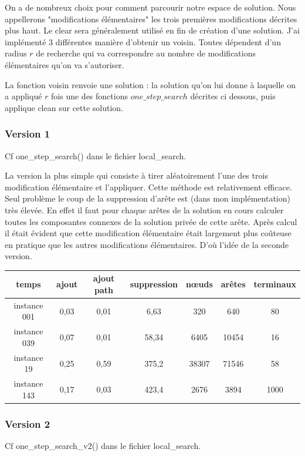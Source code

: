 \documentclass[10pt,a4paper]{article}
\begin{document}
On a de nombreux choix pour comment parcourir notre espace de solution. Nous appellerons "modifications élémentaires" les trois premières modifications décrites plus haut. Le clear sera généralement utilisé en fin de création d'une solution. J'ai implémenté 3 différentes manière d'obtenir un voisin. Toutes dépendent d'un radius $ r$ de recherche qui va correspondre au nombre de modifications élémentaires qu'on va s'autoriser. 

La fonction voisin renvoie une solution : la solution qu'on lui donne à laquelle on a appliqué $r$ fois une des fonctions $one\_step\_search$ décrites ci dessous, puis applique clean sur cette solution.

\subsubsection{Version 1}

Cf one\_step\_search() dans le fichier local\_search.

La version la plus simple qui consiste à tirer aléatoirement l'une des trois modification élémentaire et l'appliquer. Cette méthode est relativement efficace. Seul problème le coup de la suppression d'arête est (dans mon implémentation) très élevée. En effet il faut pour chaque arêtes de la solution en cours calculer toutes les composantes connexes de la solution privée de cette arête. Après calcul il était évident que cette modification élémentaire était largement plus coûteuse en pratique que les autres modifications élémentaires. D’où l'idée de la seconde version.

\begin{tabular}{|c|c|c|c|c|c|c|}
\hline 
temps & ajout & ajout path & suppression & nœuds & arêtes & terminaux  \\ 
\hline 
instance 001 & 0,03 & 0,01 & 6,63 & 320 & 640 & 80 \\ 
\hline 
instance 039 & 0,07 & 0,01 & 58,34 & 6405 & 10454 & 16 \\ 
\hline 
instance  19 & 0,25 & 0,59 & 375,2 & 38307 & 71546 & 58 \\
\hline 
instance  143 & 0,17 & 0,03 & 423,4 & 2676 & 3894 & 1000 \\ 
\hline 
\end{tabular} 

\subsubsection{Version 2}
Cf one\_step\_search\_v2() dans le fichier local\_search.
\end{document}
